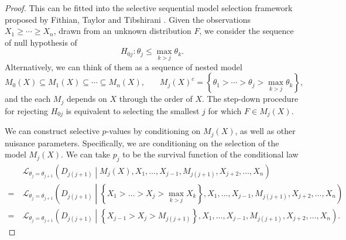 \documentclass[11pt]{article}
\begin{document}
\begin{proof}

This can be fitted into the selective sequential model selection framework proposed by Fithian, Taylor and Tibshirani \cite{Fithian:2015uj}. Given the observations $X_1 \ge \cdots \ge X_n$, drawn from an unknown distribution $F$, we consider the sequence of null hypothesis of
$$H_{0j}: \theta_j \le \max_{k > j} \theta_k.$$
Alternatively, we can think of them as a sequence of nested model
$$M_0\left(X\right) \subseteq M_1\left(X\right) \subseteq \cdots \subseteq M_n\left(X\right), ~~~~~~~~ M_j\left(X\right)^c = \left\{\theta_1 > \cdots > \theta_j > \max_{k > j} \theta_k\right\},$$
and the each $M_j$ depends on $X$ through the order of $X$. The step-down procedure for rejecting $H_{0j}$ is equivalent to selecting the smallest $j$ for which $F \in M_j\left(X\right)$.

We can construct selective $p$-values by conditioning on $M_j\left(X\right)$, as well as other nuisance parameters. Specifically, we are conditioning on the selection of the model $M_j\left(X\right)$. We can take $p_j$ to be the survival function of the conditional law
\begin{align}
&~ \mathcal{L}_{\theta_j = \theta_{j+1}} \left(D_{j\left(j+1\right)} \middle| M_j\left(X\right), X_1, \ldots, X_{j-1}, M_{j\left(j+1\right)}, X_{j+2}, \ldots, X_n\right) \nonumber \\
= &~ \mathcal{L}_{\theta_j = \theta_{j+1}} \left(D_{j\left(j+1\right)} \middle| \left\{X_1 > \ldots > X_j > \max_{k > j} X_k\right\}, X_1, \ldots, X_{j-1}, M_{j\left(j+1\right)}, X_{j+2}, \ldots, X_n\right) \nonumber \\
= &~ \mathcal{L}_{\theta_j = \theta_{j+1}} \left(D_{j\left(j+1\right)} \middle| \left\{X_{j-1} > X_j > M_{j\left(j+1\right)}\right\}, X_1, \ldots, X_{j-1}, M_{j\left(j+1\right)}, X_{j+2}, \ldots, X_n\right). \label{eqn:step_down_law}
\end{align}


\end{proof}
\end{document}
